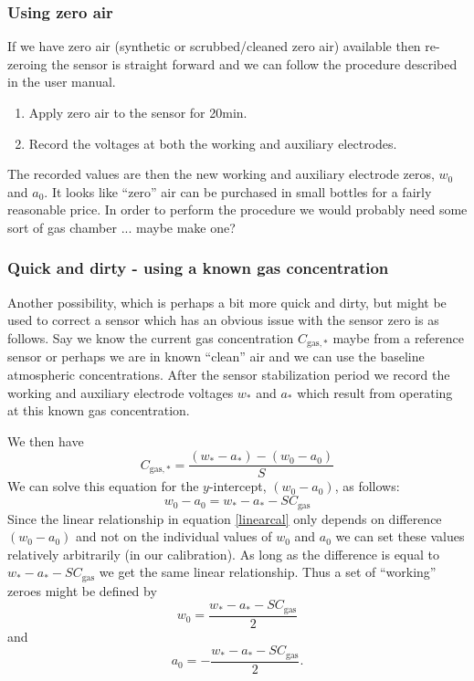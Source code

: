 \documentclass[letterpaper]{article}
\newcommand{\cgas}{C_{\mathrm{gas}}}
\newcommand{\cgasnorm}{C_{\mathrm{gas,*}}}
\newcommand{\wrk}{w}
\newcommand{\aux}{a}
\newcommand{\wrknorm}{\wrk_{\mathrm{*}}}
\newcommand{\auxnorm}{\aux_{\mathrm{*}}}
\begin{document}
\subsubsection{Using zero air}
If we have zero air (synthetic or scrubbed/cleaned zero air) available then
re-zeroing the sensor is straight forward and we can follow the procedure
described in the user manual.  

\begin{enumerate}
    \item Apply zero air to the sensor for 20min.  
    \item Record the voltages at both the working and auxiliary electrodes. 
\end{enumerate}

The recorded values are then the new working and auxiliary electrode zeros,
$\wrk_0$ and $\aux_0$.  It looks like ``zero'' air can be purchased in small
bottles for a fairly reasonable price. In order to perform the procedure we
would probably need some sort of gas chamber ... maybe make one?

\subsubsection{Quick and dirty - using a known gas concentration}
Another possibility, which is perhaps a bit more quick and dirty, but might be
used to correct a sensor which has an obvious issue with the sensor zero is as
follows.  Say we know the current  gas concentration $\cgasnorm$ maybe from a
reference sensor or perhaps we are in known ``clean'' air and we can use the
baseline atmospheric concentrations.  After the sensor stabilization period we
record the working and auxiliary electrode voltages  $\wrknorm$ and $\auxnorm$
which result from operating at this known  gas concentration. 
    
We then have 
\begin{equation}
    \cgasnorm = \frac{(\wrknorm - \auxnorm) - (\wrk_0 - \aux_0)}{S}
\end{equation}
We can solve this equation for the $y$-intercept, $(\wrk_0 - \aux_0)$, as follows:
\begin{equation}
    \wrk_0 - \aux_0 = \wrknorm - \auxnorm - S \cgas 
\end{equation}
Since the linear relationship in equation \ref{linearcal}  only depends
on difference $(\wrk_0 - \aux_0)$ and not on the individual values of $\wrk_0$
and $\aux_0$ we can set these values relatively arbitrarily (in our
calibration). As long as the difference is equal to $\wrknorm - \auxnorm - S \cgas$
we get the same linear relationship. Thus a set of ``working'' zeroes might be
defined
by 
\begin{equation}
    \wrk_0 = \frac{ \wrknorm - \auxnorm - S\cgas}{2}
\end{equation}
and 
\begin{equation}
    \aux_0 = - \frac{\wrknorm - \auxnorm - S \cgas}{2}.
\end{equation}
\end{document}
